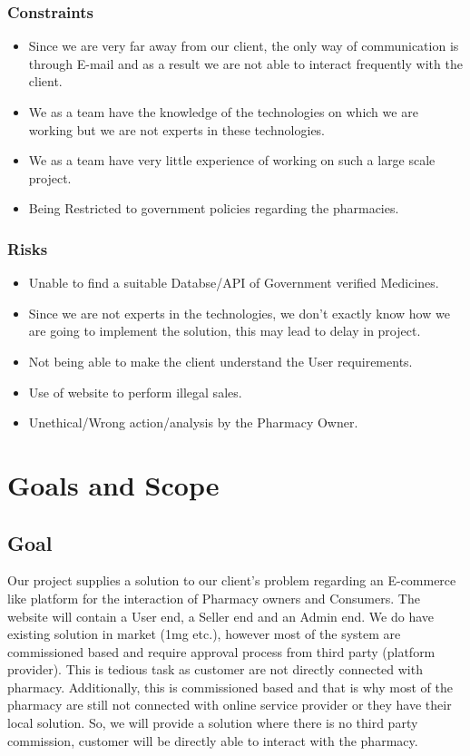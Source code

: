 \documentclass[
10pt, %
a4paper, %
oneside, %
headinclude,footinclude, %
BCOR5mm, %
]{scrartcl}
\begin{document}
\subsubsection{Constraints}
\begin{itemize}
\item Since we are very far away from our client, the only way of communication is through E-mail and as a result we are not able to interact frequently with the client.
\item We as a team have the knowledge of the technologies on which we are working but we are not experts in these technologies.
\item We as a team have very little experience of working on such a large scale project.
\item Being Restricted to government policies regarding the pharmacies.
\end{itemize}

\subsubsection{Risks}
\begin{itemize}
\item Unable to find a suitable Databse/API of Government verified Medicines.
\item Since we are not experts in the technologies, we don't exactly know how we are going to implement the solution, this may lead to delay in project.
\item Not being able to make the client understand the User requirements.
\item Use of website to perform illegal sales.
\item Unethical/Wrong action/analysis by the Pharmacy Owner.
\end{itemize}


 

\section{Goals and Scope}


\subsection{Goal}
Our project supplies a solution to our client's problem regarding an E-commerce like platform for the interaction of Pharmacy owners and Consumers. The website will contain a User end, a Seller end and an Admin end. We do have existing solution in market (1mg etc.), however most of the system are commissioned based and require approval process from third party (platform provider). This is tedious task as customer are not directly connected with pharmacy. Additionally, this is commissioned based and that is why most of the pharmacy are still not connected with online service provider or they have their local solution. So, we will provide a solution where there is no third party commission, customer will be directly able to interact with the pharmacy.
\end{document}
